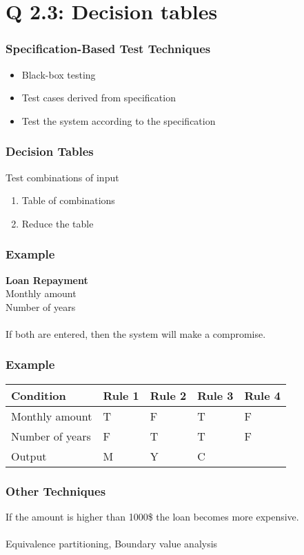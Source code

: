 
\section{Q 2.3: Decision tables}

\begin{frame}
    \frametitle{Specification-Based Test Techniques}
    \begin{itemize}
        \item Black-box testing
        \item Test cases derived from specification
        \item Test the system according to the specification
    \end{itemize}
\end{frame}

\begin{frame}
    \frametitle{Decision Tables}
    Test combinations of input
    \begin{enumerate}
        \item Table of combinations
        \item Reduce the table
    \end{enumerate}
\end{frame}

\begin{frame}
    \frametitle{Example}
    \textbf{Loan Repayment}\\
    Monthly amount\\
    Number of years\\~\\
    If both are entered, then the system will make a compromise.
\end{frame}

\begin{frame}
    \frametitle{Example}
    \centering
    \begin{tabular}{ l | l | l | l | l }
        \textbf{Condition} & \textbf{Rule 1} & \textbf{Rule 2} &
            \textbf{Rule 3} & \textbf{Rule 4}\\ \hline
        Monthly amount  & T & F & T & F\\
        Number of years & F & T & T & F\\
        Output          & M & Y & C & \cellcolor{red}\\
    \end{tabular}
\end{frame}

\begin{frame}
    \frametitle{Other Techniques}
    If the amount is higher than 1000\$ the loan becomes more expensive.\\~\\

    Equivalence partitioning, Boundary value analysis
\end{frame}


